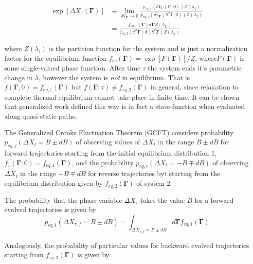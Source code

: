 \documentclass[a4paper,12pt,nofootinbib]{article}
\begin{document}
\begin{equation}
\begin{aligned}
\label{GeneralizedWorkDef}
  \exp[\Delta X_{\tau}(\bm{\Gamma})] &\equiv \lim_{\delta V_{\bm{\Gamma}} \to 0} \frac{p_{eq,1} (\delta V_{\bm{\Gamma}}(\bm{\Gamma};0))Z(\lambda_1)}{p_{eq,2} (\delta V_{\bm{\Gamma}}(S^{\tau}\bm{\Gamma};0))Z(\lambda_2)} \\
  &= \frac{f_{eq,1}(\bm{\Gamma}) d\bm{\Gamma} Z(\lambda_1)}{f_{eq,2}(S^{\tau}\bm{\Gamma}) d(S^{\tau}\bm{\Gamma}) Z(\lambda_2)}
\end{aligned}
\end{equation}

where $Z(\lambda_i)$ is the partition function for the system and is just a normalization factor for the equilibrium function $f_{eq}(\bm{\Gamma}) =\exp[F(\bm{\Gamma})]/Z$, where$F(\bm{\Gamma})$ is some single-valued phase function. After time $\tau$ the system ends it's parametric change in $\lambda$, however the system is \textit{not} in equilibrium. That is $f(\bm{\Gamma};0)=f_{eq,1}(\bm{\Gamma})$ but $f(\bm{\Gamma};\tau)\neq f_{eq,2}(\bm{\Gamma})$ in general, since relaxation to complete thermal equilibrium cannot take place in finite time.
It can be shown that generalized work defined this way is in fact a state-function when evaluated along quasi-static paths.

The Generalized Crooks Fluctuation Theorem (GCFT) considers probability $p_{eq,f}(\Delta X_t = B \pm dB)$ of observing values of $\Delta X_t$ in the range $B\pm dB$ for forward trajectories starting from the initial equilibrium distribution 1, $f_1(\bm{\Gamma};0)=f_{eq,1}(\bm{\Gamma})$, and the probability $p_{eq,r}(\Delta X_t = -B \mp dB)$ of observing $\Delta X_t$ in the range $ -B\mp dB$ for reverse trajectories byt starting from the equilibrium distribution given by $f_{eq,2}(\bm{\Gamma})$ of system 2.

The probability that the phase variable $\Delta X_{\tau}$ takes the value $B$ for a forward evolved trajectories is given by
\begin{equation}
  p_{eq,1}(\Delta X_{\tau,f}=B\pm dB) = \int_{\Delta X_{\tau,f}=B\pm dB} d\bm{\Gamma} f_{eq,1}(\bm{\Gamma})
\end{equation}

Analogously, the probability of particular values for backward evolved trajectories starting from $f_{eq,2}(\bm{\Gamma})$ is given by
\end{document}
